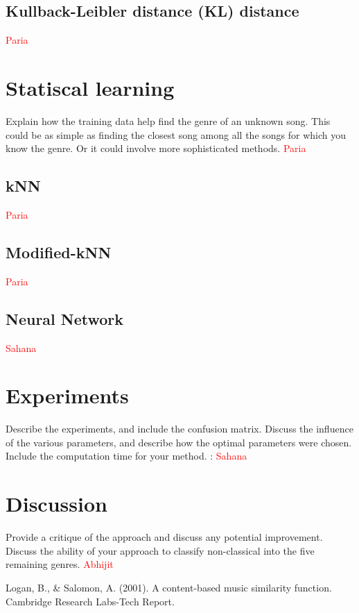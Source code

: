\documentclass[12pt]{article}
\begin{document}
\subsection{Kullback-Leibler distance (KL) distance}\textcolor{red}{Paria}

\section{Statiscal learning}
Explain how the training data help find the genre of an unknown
song. This could be as simple as finding the closest song among all
the songs for which you know the genre. Or it could involve more
sophisticated methods. \textcolor{red}{Paria}

\subsection{kNN}\textcolor{red}{Paria}

\subsection{Modified-kNN}\textcolor{red}{Paria}

\subsection{Neural Network}\textcolor{red}{Sahana}
\section{Experiments}
Describe the experiments, and include the confusion matrix. Discuss
the influence of the various parameters, and describe how the optimal
parameters were chosen. Include the computation time for your method. : \textcolor{red}{Sahana}
\section{Discussion}
Provide a critique of the approach and discuss any potential
improvement. Discuss the ability of your approach to classify
non-classical into the five remaining genres. \textcolor{red}{Abhijit}
\begin{thebibliography}{9}
	Logan, B., & Salomon, A. (2001). A content-based music similarity function. Cambridge Research Labs-Tech Report.
\end{thebibliography}
\end{document}
